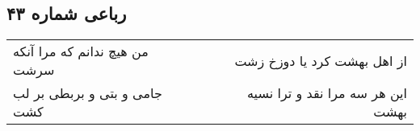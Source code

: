 \begin{center}
\section*{رباعی شماره ۴۳}
\label{sec:sh043}
\begin{longtable}{l p{0.5cm} r}
من هیچ ندانم که مرا آنکه سرشت
&&
از اهل بهشت کرد یا دوزخ زشت
\\
جامی و بتی و بربطی بر لب کشت
&&
این هر سه مرا نقد و ترا نسیه بهشت
\\
\end{longtable}
\end{center}
